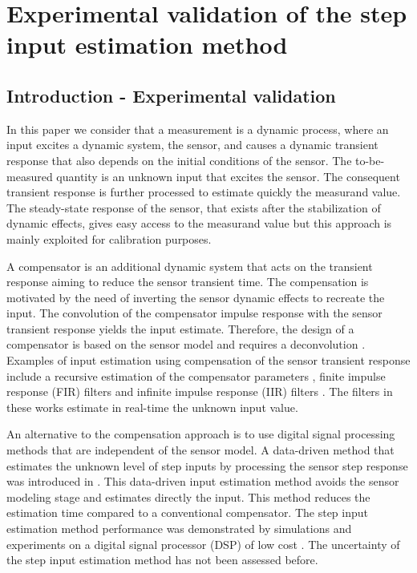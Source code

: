 \glsresetall

\chapter{Experimental validation of the step input estimation method }\label{chap:ExperimentalValidation}
\vfill{}


 
 
 \section{Introduction  - Experimental validation}

 In this paper we consider that a measurement is a dynamic process, where an input excites a dynamic system, the sensor, and causes a dynamic transient response that also depends on the initial conditions of the sensor.
The to-be-measured quantity is an unknown input that excites the sensor.
The consequent transient response is further processed to estimate quickly the measurand value.
The steady-state response of the sensor, that exists after the stabilization of dynamic effects, gives easy access to the measurand value but this approach is mainly exploited for calibration purposes.

A compensator is an additional dynamic system that acts on the transient response aiming to reduce the sensor transient time.
The compensation is motivated by the need of inverting the sensor dynamic effects to recreate the input.
The convolution of the compensator impulse response with the sensor transient response yields the input estimate.
Therefore, the design of a compensator is based on the sensor model and requires a deconvolution \cite{Eichstadt10}.
Examples of input estimation using compensation of the sensor transient response include a recursive estimation of the compensator parameters \cite{Shu93}, 
finite impulse response (FIR) \cite{Elster07, Niedzwiecki16b} filters and 
infinite impulse response (IIR) filters \cite{Pintelon90, Elster08}.
The filters in these works estimate in real-time the unknown input value.

An alternative to the compensation approach is to use digital signal processing methods that are independent of the sensor model.
A data-driven method that estimates the unknown level of step inputs by processing the sensor step response was introduced in \cite{Markovsky15ieee}. 
This data-driven input estimation method avoids the sensor modeling stage and estimates directly the input.
This method reduces the estimation time compared to a conventional compensator.
The step input estimation method performance was demonstrated by simulations and experiments on a digital signal processor (DSP) of low cost \cite{Markovsky15cep}.
The uncertainty of the step input estimation method has not been assessed before.

